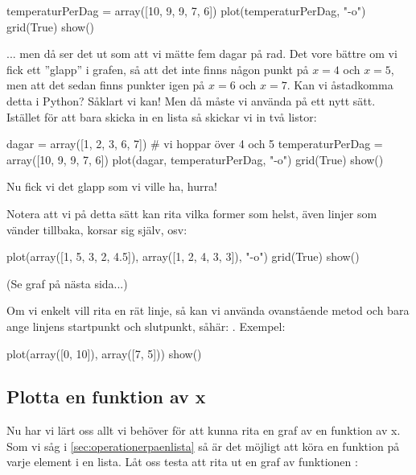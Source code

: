 \begin{python}[caption={Syns inte att torsdag och fredag saknas},label={}]
temperaturPerDag = array([10, 9, 9, 7, 6])
plot(temperaturPerDag, "-o")
grid(True)
show()
\end{python}


... men då ser det ut som att vi mätte fem dagar på rad. Det vore bättre om vi fick ett ''glapp'' i grafen, så att det inte finns någon punkt på $x=4$ och $x=5$, men att det sedan finns punkter igen på $x=6$ och $x=7$. Kan vi åstadkomma detta i Python? Såklart vi kan! Men då måste vi använda  på ett nytt sätt. Istället för att bara skicka in en lista så skickar vi in två listor:

\begin{python}[caption={Syns att torsdag och fredag saknas},label={}]
dagar = array([1, 2, 3, 6, 7]) # vi hoppar över 4 och 5
temperaturPerDag = array([10, 9, 9, 7, 6])
plot(dagar, temperaturPerDag, "-o")
grid(True)
show()
\end{python}


Nu fick vi det glapp som vi ville ha, hurra!

Notera att vi på detta sätt kan rita vilka former som helst, även linjer som vänder tillbaka, korsar sig själv, osv:

\begin{python}[caption={Plotta vilken form som helst},label={}]
plot(array([1, 5, 3, 2, 4.5]), array([1, 2, 4, 3, 3]), "-o")
grid(True)
show()
\end{python}
(Se graf på nästa sida...)
\newpage
{}

Om vi enkelt vill rita en rät linje, så kan vi använda ovanstående metod och bara ange linjens startpunkt och slutpunkt, såhär:  . Exempel:
\begin{python}[caption={Rät linje},label={}]
plot(array([0, 10]), array([7, 5]))
show()
\end{python}

\subsection{Plotta en funktion av x}
Nu har vi lärt oss allt vi behöver för att kunna rita en graf av en funktion av x. Som vi såg i \autoref{sec:operationerpaenlista} så är det möjligt att köra en funktion på varje element i en lista. Låt oss testa att rita ut en graf av funktionen :

